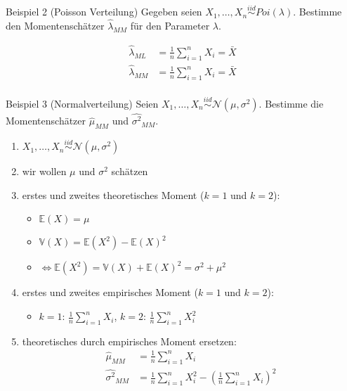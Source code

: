 \documentclass[t,11pt,aspectratio=169]{beamer}
\begin{document}
\begin{frame}
\begin{block}{Beispiel 2 (Poisson Verteilung)}
	Gegeben seien $X_1,\dots,X_n\overset{iid}{\sim}Poi(\lambda)$. Bestimme den Momentenschätzer $\hat{\lambda}_{MM}$ für den Parameter $\lambda$.
\end{block}
\begin{align*}
\hat{\lambda}_{ML}&=\frac{1}{n} \sum_{i=1}^{n} X_i=\bar{X} \\
\hat{\lambda}_{MM}&=\frac{1}{n} \sum_{i=1}^{n} X_i=\bar{X} \\
\end{align*}
\end{frame}

\begin{frame}
\begin{block}{Beispiel 3 (Normalverteilung)}
	Seien $X_1,\dots,X_n\overset{iid}{\sim}\mathcal{N}(\mu,\sigma^2)$. Bestimme die Momentenschätzer $\hat{\mu}_{MM}$ und $\hat{\sigma^2}_{MM}$.
\end{block}
\end{frame}

\begin{frame}
\begin{enumerate}[<+->]
\item $X_1,\dots,X_n\overset{iid}{\sim}\mathcal{N}(\mu,\sigma^2)$
\item wir wollen $\mu$ und $\sigma^2$ schätzen
\item erstes und zweites theoretisches Moment ($k=1$ und $k=2$):
\begin{itemize}
\item $\mathbb{E}(X) = \mu	$
\item $\mathbb{V}(X)=\mathbb{E}(X^2)-\mathbb{E}(X)^2$
\item[] $ \Longleftrightarrow \mathbb{E}(X^2) = \mathbb{V}(X) + \mathbb{E}(X)^2 = \sigma^2 + \mu^2$
\end{itemize}
\item erstes und zweites empirisches Moment ($k=1$ und $k=2$):
\begin{itemize}
\item $k=1$: $\frac{1}{n}\sum_{i=1}^{n}X_i$, $k=2$: $\frac{1}{n}\sum_{i=1}^{n}X_i^2$
\end{itemize}
\item theoretisches durch empirisches Moment ersetzen:
\begin{align*}
\hat{\mu}_{MM} &= \frac{1}{n}\sum_{i=1}^{n}X_i\\
\hat{\sigma^2}_{MM} &= \frac{1}{n}\sum_{i=1}^{n}X_i^2 - \left(\frac{1}{n}\sum_{i=1}^{n}X_i\right)^2
\end{align*}
\end{enumerate}
\end{frame}
\end{document}
